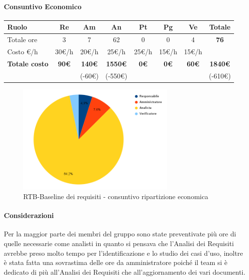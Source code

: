 \paragraph{Consuntivo Economico}
\begin{center}
	\renewcommand{\arraystretch}{1.8}
	\begin{tabular}{ |m{6em}|c|c|c|c|c|c|c| }
	\hline
	\textbf{Ruolo} & \textbf{Re} & \textbf{Am} &  \textbf{An} &  \textbf{Pt} &  \textbf{Pg} &  \textbf{Ve} &  \textbf{Totale}\\
    \hline
    Totale ore & 3 & 7 & 62 & 0 & 0 & 4 & \textbf{76}\\
    \hline
    Costo \euro/h & 30\euro/h & 20\euro/h & 25\euro/h & 25\euro/h & 15\euro/h & 15\euro/h & \\
    \hline
    \textbf{Totale costo} & \textbf{90\euro} & \textbf{140\euro} &  \textbf{1550\euro} & \textbf{0\euro} &  \textbf{0\euro} &  \textbf{60\euro} &  \textbf{1840\euro} \\
    &  & (-60\euro) & (-550\euro) &  &  &  & (-610\euro) \\
    \hline
	\end{tabular}

    \begin{figure}[H]
        \centering\includegraphics[width=0.7\textwidth, height=0.7\textheight, keepaspectratio]{images/consuntivo/RTB-requisiti-costo.png}
        \caption{RTB-Baseline dei requisiti - consuntivo ripartizione economica}
    \end{figure}
\end{center}

\paragraph{Considerazioni} \hfill \break
Per la maggior parte dei membri del gruppo sono state preventivate più ore di quelle necessarie come analisti in quanto 
si pensava che l'Analisi dei Requisiti avrebbe preso molto tempo per l'identificazione e lo studio dei casi d'uso, inoltre è stata
fatta una sovrastima delle ore da amministratore poiché il team si è dedicato di più all'Analisi dei Requisiti 
che all'aggiornamento dei vari documenti.

